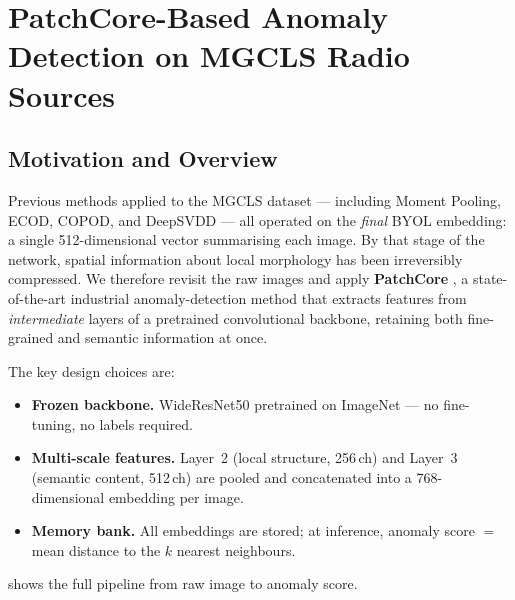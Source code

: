 \section{PatchCore-Based Anomaly Detection on MGCLS Radio Sources}
\label{sec:patchcore}

\subsection{Motivation and Overview}
\label{sec:patchcore:motivation}

Previous methods applied to the MGCLS dataset --- including Moment
Pooling, ECOD, COPOD, and DeepSVDD --- all operated on the \emph{final}
BYOL embedding: a single 512-dimensional vector summarising each image.
By that stage of the network, spatial information about local morphology
has been irreversibly compressed.
We therefore revisit the raw images and apply \textbf{PatchCore}
\citep{Roth2022}, a state-of-the-art industrial anomaly-detection
method that extracts features from \emph{intermediate} layers of a
pretrained convolutional backbone, retaining both fine-grained and
semantic information at once.

The key design choices are:
\begin{itemize}
  \item \textbf{Frozen backbone.}  WideResNet50 \citep{Zagoruyko2016}
        pretrained on ImageNet --- no fine-tuning, no labels required.
  \item \textbf{Multi-scale features.}  Layer~2 (local structure,
        256\,ch) and Layer~3 (semantic content, 512\,ch) are pooled and
        concatenated into a 768-dimensional embedding per image.
  \item \textbf{Memory bank.}  All embeddings are stored; at inference,
        anomaly score $=$ mean distance to the $k$ nearest neighbours.
\end{itemize}

 shows the full pipeline from raw image to anomaly
score.

